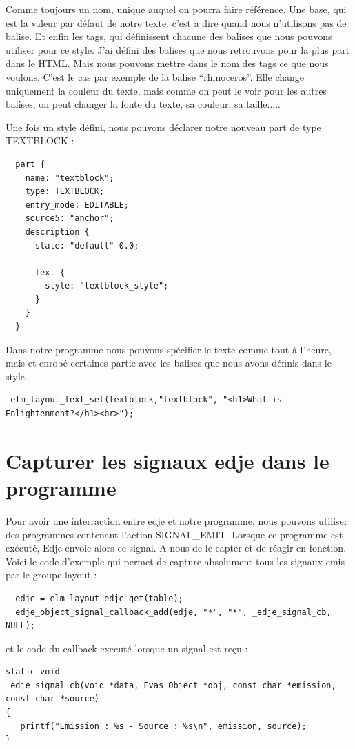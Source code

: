 \documentclass[a4paper]{efr}
\begin{document}
Comme toujours un nom, unique auquel on pourra faire référence.
Une base, qui est la valeur par défaut de notre texte, c'est a dire
quand nous n'utilisons pas de balise. Et enfin les tags, qui définissent
chacune des balises que nous pouvons utiliser pour ce style.
J'ai défini des balises que nous retrouvons pour la plus part dans le HTML.
Mais nous pouvons mettre dans le nom des tags ce que nous voulons.
C'est le cas par exemple de la balise ``rhinoceros''. Elle change uniquement
la couleur du texte, mais comme on peut le voir pour les autres balises, on peut
changer la fonte du texte, sa couleur, sa taille.....

Une fois un style défini, nous pouvons déclarer notre nouveau part de type
TEXTBLOCK :

\begin{lstlisting}
  part {
    name: "textblock";
    type: TEXTBLOCK;
    entry_mode: EDITABLE;
    source5: "anchor";
    description {
      state: "default" 0.0;

      text {
        style: "textblock_style";
      }
    }
  }
\end{lstlisting}

Dans notre programme nous pouvons spécifier le texte comme tout à l'heure, mais
et enrobé certaines partie avec les balises que nous avons définis dans le style.

\begin{lstlisting}
 elm_layout_text_set(textblock,"textblock", "<h1>What is Enlightenment?</h1><br>");
\end{lstlisting}

\section{Capturer les signaux edje dans le programme}

Pour avoir une interraction entre edje et notre programme, nous pouvons utiliser
des programmes contenant l'action SIGNAL\_EMIT. Lorsque ce programme est
exécuté, Edje envoie alors ce signal. A nous de le capter et de réagir en
fonction.
Voici le code d'exemple qui permet de capture absolument tous les signaux emis
par le groupe layout :
\begin{lstlisting}
  edje = elm_layout_edje_get(table);
  edje_object_signal_callback_add(edje, "*", "*", _edje_signal_cb, NULL);
\end{lstlisting}

et le code du callback executé lorsque un signal est reçu :
\begin{lstlisting}
static void
_edje_signal_cb(void *data, Evas_Object *obj, const char *emission, const char *source)
{
   printf("Emission : %s - Source : %s\n", emission, source);
}
\end{lstlisting}
\end{document}
